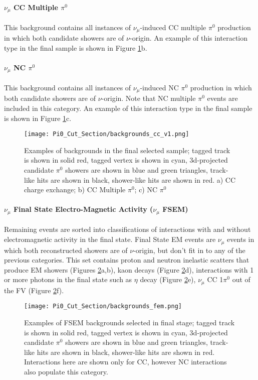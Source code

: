 \paragraph{$\nu_\mu$ CC Multiple $\pi^0$}
This background contains all instances of $\nu_\mu$-induced CC multiple $\pi^0$ production in which both candidate showers are of $\nu$-origin.  An example of this interaction type in the final sample is shown in Figure \ref{fig:backgrounds_cc}b.

\paragraph{$\nu_\mu$ NC $\pi^0$}
This background contains all instances of $\nu_\mu$-induced NC $\pi^0$ production in which both candidate showers are of $\nu$-origin. Note that NC multiple $\pi^0$ events are included in this category.  An example of this interaction type in the final sample is shown in Figure \ref{fig:backgrounds_cc}c. 

\begin{figure}[H]
\centering
\texttt{[image: Pi0\_Cut\_Section/backgrounds\_cc\_v1.png]}
\caption{ Examples of backgrounds in the final selected sample; tagged track is shown in solid red, tagged vertex is shown in cyan, 3d-projected candidate $\pi^0$ showers are shown in blue and green triangles, track-like hits are shown in black, shower-like hits are shown in red. a) CC charge exchange; b) CC Multiple $\pi^0$; c) NC $\pi^0$ }
\label{fig:backgrounds_cc}
\end{figure}

\paragraph{ $\nu_\mu$ Final State Electro-Magnetic Activity ($\nu_\mu$ FSEM)}
Remaining events are sorted into classifications of interactions with and without electromagnetic activity in the final state.  Final State EM events are $\nu_\mu$ events in which both reconstructed showers are of $\nu$-origin, but don't fit in to any of the previous categories. This set contains proton and neutron inelastic scatters that produce EM showers (Figures \ref{fig:backgrounds_nc}a,b), kaon decays (Figure \ref{fig:backgrounds_nc}d),  interactions with 1 or more photons in the final state such as $\eta$ decay (Figure \ref{fig:backgrounds_nc}e), $\nu_\mu$ CC 1$\pi^0$ out of the FV (Figure \ref{fig:backgrounds_nc}f).

\begin{figure}[H]
\centering
\texttt{[image: Pi0\_Cut\_Section/backgrounds\_fem.png]}
\caption{ Examples of FSEM backgrounds selected in final stage; tagged track is shown in solid red, tagged vertex is shown in cyan, 3d-projected candidate $\pi^0$ showers are shown in blue and green triangles, track-like hits are shown in black, shower-like hits are shown in red. Interactions here are shown only for CC, however NC interactions also populate this category. }
\label{fig:backgrounds_nc}
\end{figure}


